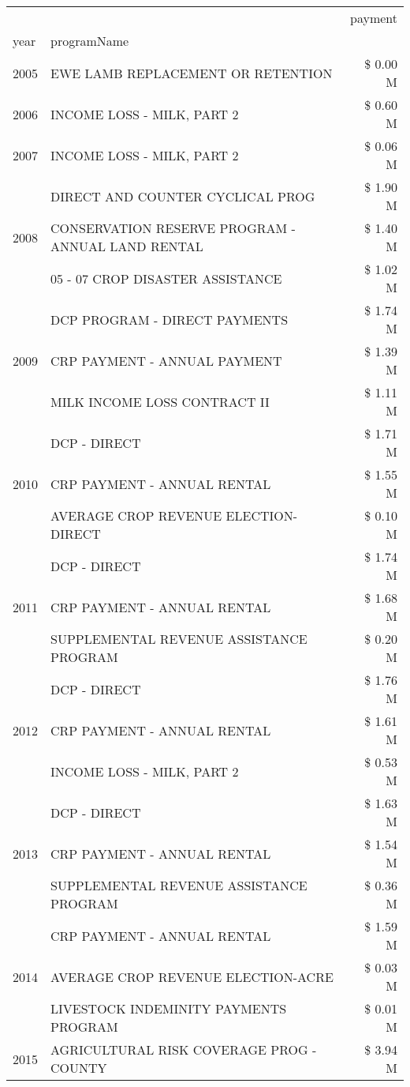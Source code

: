 \begin{tabular}{llr}
\toprule
 &  & payment \\
year & programName &  \\
\midrule
2005 & EWE LAMB REPLACEMENT OR RETENTION & \$ 0.00 M \\
\cline{1-3}
2006 & INCOME LOSS - MILK, PART 2 & \$ 0.60 M \\
\cline{1-3}
2007 & INCOME LOSS - MILK, PART 2 & \$ 0.06 M \\
\cline{1-3}
\multirow[t]{3}{*}{2008} & DIRECT AND COUNTER CYCLICAL PROG & \$ 1.90 M \\
 & CONSERVATION RESERVE PROGRAM - ANNUAL LAND RENTAL & \$ 1.40 M \\
 & 05 - 07 CROP DISASTER ASSISTANCE & \$ 1.02 M \\
\cline{1-3}
\multirow[t]{3}{*}{2009} & DCP PROGRAM - DIRECT PAYMENTS & \$ 1.74 M \\
 & CRP PAYMENT - ANNUAL PAYMENT & \$ 1.39 M \\
 & MILK INCOME LOSS CONTRACT II & \$ 1.11 M \\
\cline{1-3}
\multirow[t]{3}{*}{2010} & DCP - DIRECT & \$ 1.71 M \\
 & CRP PAYMENT - ANNUAL RENTAL & \$ 1.55 M \\
 & AVERAGE CROP REVENUE ELECTION-DIRECT & \$ 0.10 M \\
\cline{1-3}
\multirow[t]{3}{*}{2011} & DCP - DIRECT & \$ 1.74 M \\
 & CRP PAYMENT - ANNUAL RENTAL & \$ 1.68 M \\
 & SUPPLEMENTAL REVENUE ASSISTANCE PROGRAM & \$ 0.20 M \\
\cline{1-3}
\multirow[t]{3}{*}{2012} & DCP - DIRECT & \$ 1.76 M \\
 & CRP PAYMENT - ANNUAL RENTAL & \$ 1.61 M \\
 & INCOME LOSS - MILK, PART 2 & \$ 0.53 M \\
\cline{1-3}
\multirow[t]{3}{*}{2013} & DCP - DIRECT & \$ 1.63 M \\
 & CRP PAYMENT - ANNUAL RENTAL & \$ 1.54 M \\
 & SUPPLEMENTAL REVENUE ASSISTANCE PROGRAM & \$ 0.36 M \\
\cline{1-3}
\multirow[t]{3}{*}{2014} & CRP PAYMENT - ANNUAL RENTAL & \$ 1.59 M \\
 & AVERAGE CROP REVENUE ELECTION-ACRE & \$ 0.03 M \\
 & LIVESTOCK INDEMINITY PAYMENTS PROGRAM & \$ 0.01 M \\
\cline{1-3}
\multirow[t]{3}{*}{2015} & AGRICULTURAL RISK COVERAGE PROG - COUNTY & \$ 3.94 M \\

\end{tabular}
